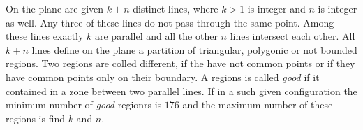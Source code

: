 On the plane are given $ k+n$  distinct lines, where $ k>1$ is integer and $ n$ is integer as well. Any three of these lines do not pass through the
same point.  Among these lines exactly  $ k$ are parallel and all the other $ n$ lines intersect each other. All $ k+n$ lines define on the plane a partition
of triangular, polygonic or not bounded regions.  Two regions are colled different, if the have not common points
or if they have common points only on their boundary. A regions is called \emph{good} if it contained in a zone between two parallel lines. 
If in a such given configuration the minimum number of \emph{good} regionrs is $ 176$ and the maximum number of these regions is  find $ k$ and $n$.
